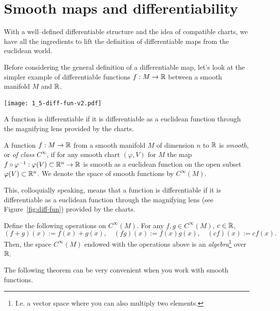 \section{Smooth maps and differentiability}\label{sec:smoothfn}

With a well--defined differentiable structure and the idea of compatible charts, we have all the ingredients to lift the definition of differentiable maps from the euclidean world.

Before considering the general definition of a differentiable map, let's look at the simpler example of differentiable functions $f:M\to\mathbb{R}$ between a smooth manifold $M$ and $\mathbb{R}$.

\begin{marginfigure}
  \texttt{[image: 1\_5-diff-fun-v2.pdf]}
  \label{fig:diff-fun}
  \caption{A function is differentiable if it is differentiable as a euclidean function through the magnifying lens provided by the charts.}
\end{marginfigure}
\begin{definition}
  A function $f:M\to\mathbb{R}$ from a smooth manifold $M$ of dimension $n$ to $\mathbb{R}$ is \emph{smooth}, or \emph{of class $C^\infty$}, if for any smooth chart $(\varphi, V)$ for $M$ the map $f\circ\varphi^{-1}:\varphi(V)\subset\mathbb{R}^n \to \mathbb{R}$ is smooth as a euclidean function on the open subset $\varphi(V)\subset\mathbb{R}^n$.
  We denote the space of smooth functions by $C^\infty(M)$.
\end{definition}

This, colloquially speaking, means that a function is differentiable if it is differentiable as a euclidean function through the magnifying lens (see Figure~\ref{fig:diff-fun}) provided by the charts.

\begin{exercise}
  Define the following operations on $C^\infty(M)$.
  For any $f,g\in C^\infty(M)$, $c\in\mathbb{R}$,
  \begin{equation}
    (f+g)(x) := f(x) + g(x),\quad
    (fg)(x) := f(x) g(x),\quad
    (cf)(x) := c f(x).
  \end{equation}
  Then, the space $C^\infty(M)$ endowed with the operations above is an \emph{algebra}\footnote{I.e. a vector space where you can also multiply two elements.} over $\mathbb{R}$.
\end{exercise}

The following theorem can be very convenient when you work with smooth functions.

